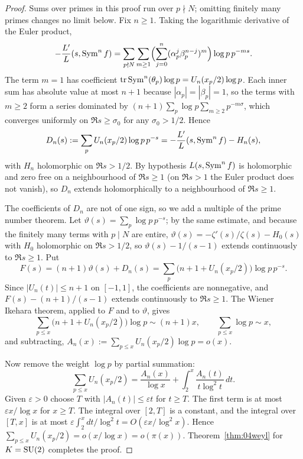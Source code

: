 \begin{proof}
Sums over primes in this proof run over $p \nmid N$; omitting finitely many primes changes no limit below. Fix $n \ge 1$. Taking the logarithmic derivative of the Euler product,
\[
-\frac{L'}{L}(s,\operatorname{Sym}^n f) = \sum_{p\nmid N}\sum_{m\ge1}\Bigl(\sum_{j=0}^n (\alpha_p^j\beta_p^{n-j})^m\Bigr)\log p\,p^{-ms}.
\]
The term $m = 1$ has coefficient $\operatorname{tr}\operatorname{Sym}^n(\theta_p)\log p = U_n(x_p/2)\log p$. Each inner sum has absolute value at most $n+1$ because $|\alpha_p| = |\beta_p| = 1$, so the terms with $m \ge 2$ form a series dominated by $(n+1)\sum_p \log p \sum_{m\ge2}p^{-m\sigma}$, which converges uniformly on $\Re s \ge \sigma_0$ for any $\sigma_0 > 1/2$. Hence
\[
D_n(s) := \sum_{p} U_n(x_p/2)\log p\,p^{-s} = -\frac{L'}{L}(s,\operatorname{Sym}^n f) - H_n(s),
\]
with $H_n$ holomorphic on $\Re s > 1/2$. By hypothesis $L(s,\operatorname{Sym}^n f)$ is holomorphic and zero free on a neighbourhood of $\Re s \ge 1$ (on $\Re s > 1$ the Euler product does not vanish), so $D_n$ extends holomorphically to a neighbourhood of $\Re s \ge 1$.

The coefficients of $D_n$ are not of one sign, so we add a multiple of the prime number theorem. Let $\vartheta(s) = \sum_p \log p\,p^{-s}$; by the same estimate, and because the finitely many terms with $p \mid N$ are entire, $\vartheta(s) = -\zeta'(s)/\zeta(s) - H_0(s)$ with $H_0$ holomorphic on $\Re s > 1/2$, so $\vartheta(s) - 1/(s-1)$ extends continuously to $\Re s \ge 1$. Put
\[
F(s) = (n+1)\vartheta(s) + D_n(s) = \sum_p \bigl(n + 1 + U_n(x_p/2)\bigr)\log p\,p^{-s}.
\]
Since $|U_n(t)| \le n+1$ on $[-1,1]$, the coefficients are nonnegative, and $F(s) - (n+1)/(s-1)$ extends continuously to $\Re s \ge 1$. The Wiener Ikehara theorem, applied to $F$ and to $\vartheta$, gives
\[
\sum_{p\le x}\bigl(n+1+U_n(x_p/2)\bigr)\log p \sim (n+1)x, \qquad \sum_{p\le x}\log p \sim x,
\]
and subtracting, $A_n(x) := \sum_{p\le x} U_n(x_p/2)\log p = o(x)$.

Now remove the weight $\log p$ by partial summation:
\[
\sum_{p\le x} U_n(x_p/2) = \frac{A_n(x)}{\log x} + \int_2^x \frac{A_n(t)}{t\log^2 t}\,dt .
\]
Given $\varepsilon > 0$ choose $T$ with $|A_n(t)| \le \varepsilon t$ for $t \ge T$. The first term is at most $\varepsilon x/\log x$ for $x \ge T$. The integral over $[2,T]$ is a constant, and the integral over $[T,x]$ is at most $\varepsilon\int_2^x dt/\log^2 t = O(\varepsilon x/\log^2 x)$. Hence $\sum_{p\le x}U_n(x_p/2) = o(x/\log x) = o(\pi(x))$. Theorem~\ref{thm:04weyl} for $K = \mathrm{SU}(2)$ completes the proof.
\end{proof}

